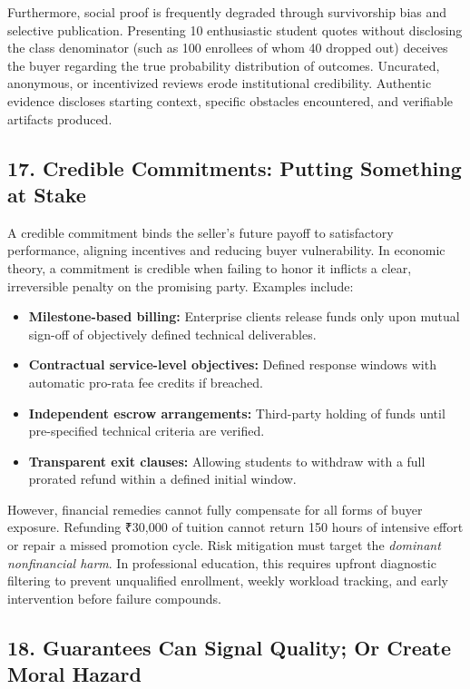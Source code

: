 Furthermore, social proof is frequently degraded through survivorship bias and selective publication. Presenting 10 enthusiastic student quotes without disclosing the class denominator (such as 100 enrollees of whom 40 dropped out) deceives the buyer regarding the true probability distribution of outcomes. Uncurated, anonymous, or incentivized reviews erode institutional credibility. Authentic evidence discloses starting context, specific obstacles encountered, and verifiable artifacts produced.

\subsection*{17. Credible Commitments: Putting Something at Stake}

A credible commitment binds the seller's future payoff to satisfactory performance, aligning incentives and reducing buyer vulnerability. In economic theory, a commitment is credible when failing to honor it inflicts a clear, irreversible penalty on the promising party. Examples include:
\begin{itemize}
\item \textbf{Milestone-based billing:} Enterprise clients release funds only upon mutual sign-off of objectively defined technical deliverables.
\item \textbf{Contractual service-level objectives:} Defined response windows with automatic pro-rata fee credits if breached.
\item \textbf{Independent escrow arrangements:} Third-party holding of funds until pre-specified technical criteria are verified.
\item \textbf{Transparent exit clauses:} Allowing students to withdraw with a full prorated refund within a defined initial window.
\end{itemize}

However, financial remedies cannot fully compensate for all forms of buyer exposure. Refunding ₹30,000 of tuition cannot return 150 hours of intensive effort or repair a missed promotion cycle. Risk mitigation must target the \emph{dominant nonfinancial harm}. In professional education, this requires upfront diagnostic filtering to prevent unqualified enrollment, weekly workload tracking, and early intervention before failure compounds.

\subsection*{18. Guarantees Can Signal Quality; Or Create Moral Hazard}

